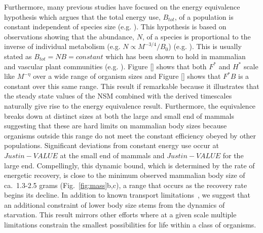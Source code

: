 \documentclass{pnastwo}
\begin{document}
\begin{article}
Furthermore, many previous studies have focused on the energy equivalence hypothesis which argues that the total energy use, $B_{tot}$, of a population is constant independent of species size (e.g. \cite{allen2002,enquist1998}). This hypothesis is based on observations showing that the abundance, $N$, of a species is proportional to the inverse of individual metabolism (e.g. $N\propto M^{-3/4}/B_{0}$)  (e.g. \cite{allen2002,enquist1998}). This is usually stated as $B_{tot}=NB=constant$ which has been shown to hold in mammalian and vascular plant communities (e.g. \cite{allen2002,enquist1998}). Figure \ref{} shows that both $F^{*}$ and $H^{*}$ scale like $M^{-\eta}$ over a wide range of organism sizes and Figure \ref{} shows that $F^{*}B$ is a constant over this same range. This result if remarkable because it illustrates that the steady state values of the NSM combined with the derived timescales naturally give rise to the energy equivalence result. Furthermore, the equivalence breaks down at distinct sizes at both the large and small end of mammals suggesting that these are hard limits on mammalian body sizes because organisms outside this range do not meet the constant efficiency obeyed by other populations. Significant deviations from constant energy use occur at $Justin -VALUE$ at the small end of mammals and $Justin -VALUE$ for the large end. Compellingly, this dynamic bound, which is determined by the rate of energetic recovery, is
close to the minimum observed mammalian body size of ca.\ 1.3-2.5 grams
(Fig.~\ref{fig:mass}b,c), a range that occurs as the recovery rate begins its
decline.  In addition to known transport limitations~\cite{West:2002ud}, we
suggest that an additional constraint of lower body size stems from the
dynamics of starvation.  This result mirrors other efforts \cite{Kempes:2012hy,Kempes:2016}
where at a given scale multiple limitations constrain the smallest possibilities for
life within a class of organisms.

%





\end{article}
\end{document}
